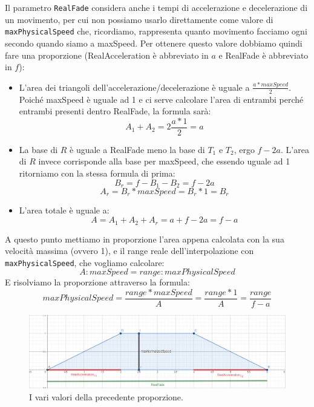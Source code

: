 \documentclass[main.tex]{subfiles}
\begin{document}
Il parametro \lstinline{RealFade} considera anche i tempi di accelerazione e decelerazione di un movimento, per cui non possiamo usarlo direttamente come valore di \lstinline{maxPhysicalSpeed} che, ricordiamo, rappresenta quanto movimento facciamo ogni secondo quando siamo a maxSpeed. Per ottenere questo valore dobbiamo quindi fare una proporzione (RealAcceleration è abbreviato in $a$ e RealFade è abbreviato in $f$):
\begin{itemize}
    \item L'area dei triangoli dell'accelerazione/decelerazione è uguale a $\frac{a * maxSpeed}{2}$. Poiché maxSpeed è uguale ad 1 e ci serve calcolare l'area di entrambi perché entrambi presenti dentro RealFade, la formula sarà:
    \[A_1 + A_2 = 2\frac{a * 1}{2} = a\]
    \item La base di $R$ è uguale a RealFade meno la base di $T_1$ e $T_2$, ergo $f - 2a$. L'area di $R$ invece corrisponde alla base per maxSpeed, che essendo uguale ad 1 ritorniamo con la stessa formula di prima:
    \[B_r = f - B_1 - B_2 = f - 2a\]
    \[A_r = B_r * maxSpeed = B_r * 1 = B_r\]
    \item L'area totale è uguale a:
    \[A = A_1 + A_2 + A_r = a + f - 2a = f - a\]
\end{itemize}
A questo punto mettiamo in proporzione l'area  appena calcolata con la sua velocità massima (ovvero 1), e il range reale dell'interpolazione con \lstinline{maxPhysicalSpeed}, che vogliamo calcolare:
\[A : maxSpeed = range : maxPhysicalSpeed\]
E risolviamo la proporzione attraverso la formula:
\[maxPhysicalSpeed = \frac{range * maxSpeed}{A} = \frac{range * 1}{A} = \frac{range}{f - a}\]
\begin{figure}[H]
    \centering
    \includegraphics[width=1\linewidth]{img/interpolazione/RealAccelerationVSRealFadeVSmaxSpeed.png}
    \caption{I vari valori della precedente proporzione.}
    \label{fig:4_RealAccelerationVSRealFadeVSmaxSpeed}
\end{figure}
\clearpage %
\end{document}

